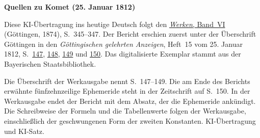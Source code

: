 \clearpage\thispagestyle{empty}
\begin{center}\textbf{Quellen zu Komet (25. Januar 1812)}\end{center}
\noindent Diese KI-Übertragung ins heutige Deutsch folgt den \href{https://gdz.sub.uni-goettingen.de/id/PPN236007467}{\textit{Werken}, Band~VI} (Göttingen, 1874), S.~345--347. Der Bericht erschien zuerst unter der Überschrift Göttingen in den \textit{Göttingischen gelehrten Anzeigen}, Heft~15 vom 25. Januar 1812, S.~\href{https://api.digitale-sammlungen.de/iiif/image/v2/bsb10538681_00191/full/1600,/0/default.jpg}{147}, \href{https://api.digitale-sammlungen.de/iiif/image/v2/bsb10538681_00192/full/1600,/0/default.jpg}{148}, \href{https://api.digitale-sammlungen.de/iiif/image/v2/bsb10538681_00193/full/1600,/0/default.jpg}{149} und \href{https://api.digitale-sammlungen.de/iiif/image/v2/bsb10538681_00194/full/1600,/0/default.jpg}{150}. Das digitalisierte Exemplar stammt aus der Bayerischen Staatsbibliothek.
\par\smallskip\noindent Die Überschrift der Werkausgabe nennt S.~147--149. Die am Ende des Berichts erwähnte fünfzehnzeilige Ephemeride steht in der Zeitschrift auf S.~150. In der Werkausgabe endet der Bericht mit dem Absatz, der die Ephemeride ankündigt. Die Schreibweise der Formeln und die Tabellenwerte folgen der Werkausgabe, einschließlich der geschwungenen Form der zweiten Konstanten. KI-Übertragung und KI-Satz.
\clearpage
